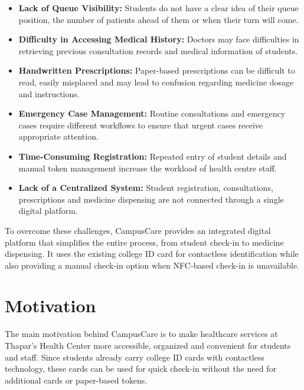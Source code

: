 \documentclass[a4paper,oneside,openany]{tietreport}
\begin{document}
\begin{itemize}

    \item \textbf{Lack of Queue Visibility:}
    Students do not have a clear idea of their queue
    position, the number of patients ahead of them
    or when their turn will come.

    \item \textbf{Difficulty in Accessing Medical History:}
    Doctors may face difficulties in retrieving previous
    consultation records and medical information of students.

    \item \textbf{Handwritten Prescriptions:}
    Paper-based prescriptions can be difficult to read,
    easily misplaced and may lead to confusion regarding
    medicine dosage and instructions.

    \item \textbf{Emergency Case Management:}
    Routine consultations and emergency cases require
    different workflows to ensure that urgent cases
    receive appropriate attention.

    \item \textbf{Time-Consuming Registration:}
    Repeated entry of student details and manual token
    management increase the workload of health centre staff.

    \item \textbf{Lack of a Centralized System:}
    Student registration, consultations, prescriptions
    and medicine dispensing are not connected through
    a single digital platform.

\end{itemize}

To overcome these challenges, CampusCare provides an
integrated digital platform that simplifies the entire
process, from student check-in to medicine dispensing.
It uses the existing college ID card for contactless
identification while also providing a manual check-in
option when NFC-based check-in is unavailable.

\section{Motivation}

The main motivation behind CampusCare is to make healthcare
services at Thapar's Health Center more accessible, organized
and convenient for students and staff. Since students already
carry college ID cards with contactless technology, these cards
can be used for quick check-in without the need for additional
cards or paper-based tokens.
\end{document}
